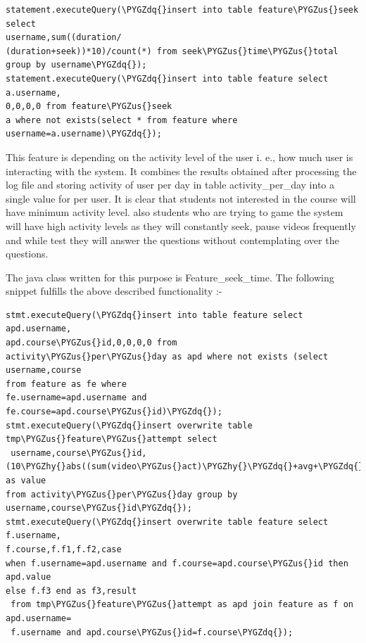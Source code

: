 \documentclass[a4paper,12pt,oneside]{sphinxmanual}
\def\PYGZus{\char`\_}
\def\PYGZhy{\char`\-}
\def\PYGZdq{\char`\"}
\begin{document}
\begin{Verbatim}[commandchars=\\\{\}]
statement.executeQuery(\PYGZdq{}insert into table feature\PYGZus{}seek select
username,sum((duration/
(duration+seek))*10)/count(*) from seek\PYGZus{}time\PYGZus{}total group by username\PYGZdq{});
statement.executeQuery(\PYGZdq{}insert into table feature select a.username,
0,0,0,0 from feature\PYGZus{}seek
a where not exists(select * from feature where username=a.username)\PYGZdq{});
\end{Verbatim}

This feature is depending on the activity level of the user i. e., how much user is interacting with the system. It combines the results obtained after processing the log file and storing activity of user per day in table activity\_per\_day into a single value for per user. It is clear that students not interested in the course will have minimum activity level. also students who are trying to game the system will have high activity levels as they will constantly seek, pause videos frequently and while test they will answer the questions without contemplating over the questions.

The  java class written for this purpose is Feature\_seek\_time. The following snippet fulfills the above described functionality :-

\begin{Verbatim}[commandchars=\\\{\}]
stmt.executeQuery(\PYGZdq{}insert into table feature select apd.username,
apd.course\PYGZus{}id,0,0,0,0 from
activity\PYGZus{}per\PYGZus{}day as apd where not exists (select username,course
from feature as fe where
fe.username=apd.username and fe.course=apd.course\PYGZus{}id)\PYGZdq{});
stmt.executeQuery(\PYGZdq{}insert overwrite table tmp\PYGZus{}feature\PYGZus{}attempt select
 username,course\PYGZus{}id,
(10\PYGZhy{}abs((sum(video\PYGZus{}act)\PYGZhy{}\PYGZdq{}+avg+\PYGZdq{})/(\PYGZdq{}+avg+\PYGZdq{}*count(*))*10)) as value
from activity\PYGZus{}per\PYGZus{}day group by
username,course\PYGZus{}id\PYGZdq{});
stmt.executeQuery(\PYGZdq{}insert overwrite table feature select f.username,
f.course,f.f1,f.f2,case
when f.username=apd.username and f.course=apd.course\PYGZus{}id then apd.value
else f.f3 end as f3,result
 from tmp\PYGZus{}feature\PYGZus{}attempt as apd join feature as f on apd.username=
 f.username and apd.course\PYGZus{}id=f.course\PYGZdq{});
\end{Verbatim}
\end{document}
